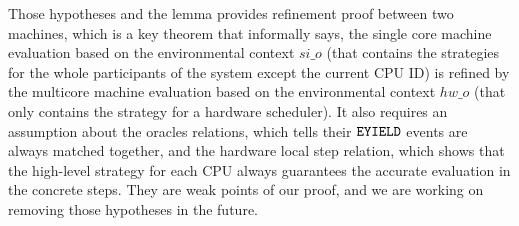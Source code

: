 Those hypotheses and the lemma provides
refinement proof between two machines, 
which is a key theorem that informally says, the single core machine evaluation based on the environmental context $si\_o$ (that contains 
the strategies for the whole participants of the system except the current CPU ID)
is refined
by the multicore machine evaluation based on the environmental context $hw\_o$ (that only contains the strategy for a hardware scheduler).
It also requires an assumption about the oracles relations, which tells their ${{\mathrm{\texttt{EYIELD}}}}$ events
are always matched together, 
and the hardware local step relation, which shows that the high-level strategy for each CPU always guarantees
the accurate evaluation in the concrete steps. 
They are weak points of our proof, and we are working on 
removing those hypotheses in the future.

